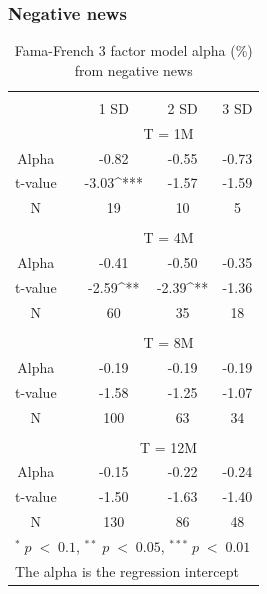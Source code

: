 \subsubsection{Negative news}

\setlength{\tabcolsep}{12pt}
\begin{table}[]
\small
\centering
\caption{Fama-French 3 factor model alpha (\%) from negative news } 
\begin{tabular}{ccccc}

\hline \hline
\\ 
      &  &    1 SD  &  2 SD  &  3 SD    \\ \cline{3-5} 
& & \multicolumn{3}{c}{ T = 1M} \\ \hline 
Alpha   &  & -0.82  & -0.55  & -0.73  \\
t-value &  & -3.03^{***} & -1.57  & -1.59  \\
N       &  &  19    & 10  & 5  \\
        &  &                          &      &      \\
& & \multicolumn{3}{c}{ T = 4M}\\ \hline
Alpha   &  & -0.41  & -0.50  &  -0.35 \\
t-value &  & -2.59^{**} & -2.39^{**}  & -1.36  \\
N       &  & 60      & 35  & 18  \\
        &  &           &      &      \\
& & \multicolumn{3}{c}{ T = 8M} \\ \hline
Alpha   &  & -0.19   & -0.19  & -0.19  \\
t-value &  & -1.58  & -1.25 & -1.07  \\
N       &  & 100 & 63   & 34  \\
        &  &                          &      &      \\
& & \multicolumn{3}{c}{ T = 12M} \\ \hline
Alpha   &  & -0.15  & -0.22  & -0.24  \\
t-value &  & -1.50  & -1.63 & -1.40  \\
N       &  & 130    & 86  & 48 \\\hline \hline
 \multicolumn{5}{l}{ \footnotesize $^* \; p\; <\; 0.1$, $ ^{**} \; p\; <\; 0.05$, $ ^{***} \; p\; <\; 0.01$  } \\ \multicolumn{5}{l}{ \footnotesize The alpha is the regression intercept } \\ 
\end{tabular}
\end{table}

